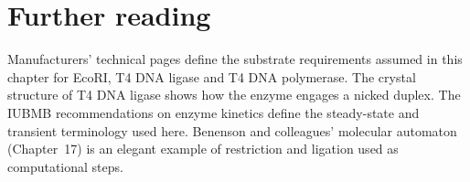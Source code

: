 \section*{Further reading}
Manufacturers' technical pages define the substrate requirements assumed in
this chapter for EcoRI,\cite{NEBEcoRI} T4 DNA ligase\cite{NEBT4Ligase} and T4 DNA
polymerase.\cite{NEBT4Pol} The crystal structure of T4 DNA ligase shows how the
enzyme engages a nicked duplex.\cite{Shi2018} The IUBMB recommendations on
enzyme kinetics define the steady-state and transient terminology used
here.\cite{IUBMB1981} Benenson and colleagues' molecular automaton (Chapter~17)
is an elegant example of restriction and ligation used as computational
steps.\cite{Benenson2001}
